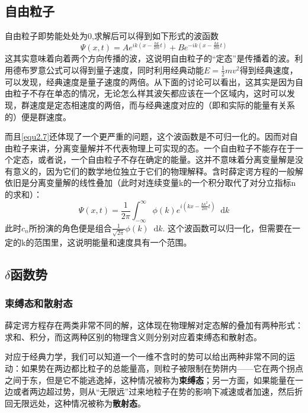 \documentclass[UTF8]{ctexart}
\begin{document}
    \subsection{自由粒子}
    自由粒子即势能处处为0,求解后可以得到如下形式的波函数
    \begin{equation}
        \Psi(x,t) = A e^{ik \left(x-\frac{\hbar k}{2m}t\right)} + B e^{-ik \left(x-\frac{\hbar k}{2m}t\right)}\label{equ2.7}
    \end{equation}
\noindent 这其实意味着向着两个方向传播的波，这说明自由粒子的“定态”是传播着的波。利用德布罗意公式可以得到量子速度，同时利用经典动能$E = \frac{1}{2} m v^2$得到经典速度，可以发现，经典速度是量子速度的两倍。从下面的讨论可以看出，这其实是因为自由粒子不存在单态的情况，无论怎么样其波矢都应该在一个区域内，这时可以发现，群速度是定态相速度的两倍，而与经典速度对应的（即和实际的能量有关系的）便是群速度。


    而且\autoref{equ2.7}还体现了一个更严重的问题，这个波函数是不可归一化的。因而对自由粒子来讲，分离变量解并不代表物理上可实现的态。一个自由粒子不能存在于一个定态，或者说，一个自由粒子不存在确定的能量。这并不意味着分离变量解是没有意义的，因为它们的数学地位独立于它们的物理解释。含时薛定谔方程的一般解依旧是分离变量解的线性叠加（此时对连续变量k的一个积分取代了对分立指标n的求和）：
    \begin{equation}
        \Psi(x,t) = \frac{1}{2 \pi}\int_{-\infty}^{\infty} \phi(k) e^{i(kx-\frac{\hbar k^2}{2m}t)} \mathop{}\!\mathrm{d} k
    \end{equation}
\noindent 此时$c_n$所扮演的角色便是组合$\frac{1}{\sqrt{2 \pi}}\phi(k) \mathop{}\!\mathrm{d} k$. 这个波函数可以归一化，但需要在一定的k的范围里，这说明能量和速度具有一个范围。

    \subsection{\texorpdfstring{$\delta$}{Lg}函数势}
    \subsubsection{束缚态和散射态}
    薛定谔方程存在两类非常不同的解，这体现在物理解对定态解的叠加有两种形式：求和、积分，而这两种区别的物理含义则分别对应着束缚态和散射态。

    对应于经典力学，我们可以知道一个一维不含时的势可以给出两种非常不同的运动：如果势在两边都比粒子的总能量高，则粒子被限制在势阱内——它在两个拐点之间于东，但是它不能逃逸掉，这种情况被称为\textbf{束缚态}；另一方面，如果能量在一边或者两边超过势，则从“无限远”过来地粒子在势的影响下减速或者加速，然后折回无限远处，这种情况被称为\textbf{散射态}。
\end{document}
